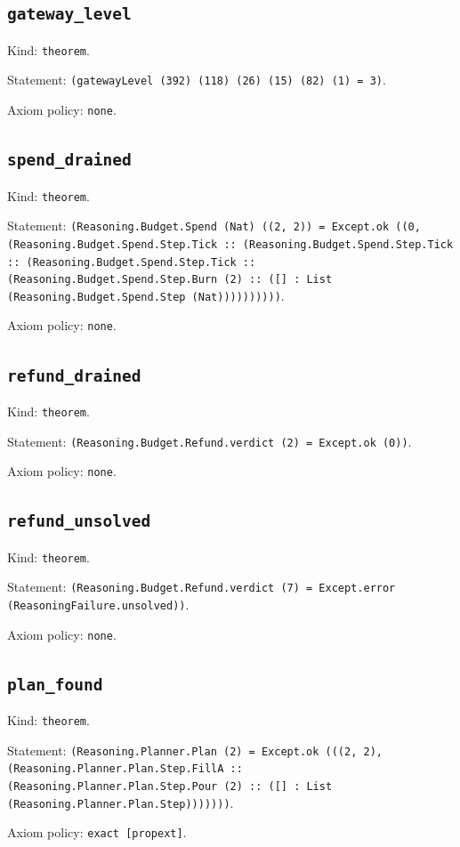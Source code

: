 \documentclass[11pt]{article}
\begin{document}
\subsection*{\texttt{gateway\_level}}
\noindent Kind: \texttt{theorem}.\par
\noindent Statement: \texttt{(gatewayLevel (392) (118) (26) (15) (82) (1) = 3)}.\par
\noindent Axiom policy: \texttt{none}.\par
\subsection*{\texttt{spend\_drained}}
\noindent Kind: \texttt{theorem}.\par
\noindent Statement: \texttt{(Reasoning.Budget.Spend (Nat) ((2, 2)) = Except.ok ((0, (Reasoning.Budget.Spend.Step.Tick :: (Reasoning.Budget.Spend.Step.Tick :: (Reasoning.Budget.Spend.Step.Tick :: (Reasoning.Budget.Spend.Step.Burn (2) :: ([] : List (Reasoning.Budget.Spend.Step (Nat))))))))))}.\par
\noindent Axiom policy: \texttt{none}.\par
\subsection*{\texttt{refund\_drained}}
\noindent Kind: \texttt{theorem}.\par
\noindent Statement: \texttt{(Reasoning.Budget.Refund.verdict (2) = Except.ok (0))}.\par
\noindent Axiom policy: \texttt{none}.\par
\subsection*{\texttt{refund\_unsolved}}
\noindent Kind: \texttt{theorem}.\par
\noindent Statement: \texttt{(Reasoning.Budget.Refund.verdict (7) = Except.error (ReasoningFailure.unsolved))}.\par
\noindent Axiom policy: \texttt{none}.\par
\subsection*{\texttt{plan\_found}}
\noindent Kind: \texttt{theorem}.\par
\noindent Statement: \texttt{(Reasoning.Planner.Plan (2) = Except.ok (((2, 2), (Reasoning.Planner.Plan.Step.FillA :: (Reasoning.Planner.Plan.Step.Pour (2) :: ([] : List (Reasoning.Planner.Plan.Step)))))))}.\par
\noindent Axiom policy: \texttt{exact [propext]}.\par
\end{document}

